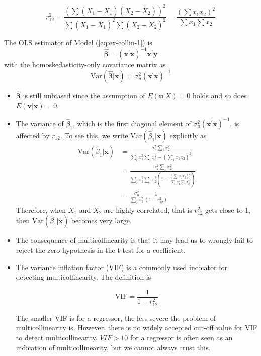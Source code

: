 \documentclass[a4paper,11pt]{article}
\newcommand{\var}{\mathrm{Var}}
\begin{document}
\begin{equation}
r^2_{12} = \frac{\left(\sum (X_1 - \bar{X}_1)(X_2 - \bar{X}_2)\right)^2}{\sum (X_1 - \bar{X}_1)^2 \sum (X_2 - \bar{X}_2)^2}
= \frac{\left( \sum x_1 x_2\right)^2}{\sum x_1 \sum x_2}
\end{equation}

The OLS estimator of Model (\ref{eq:ex-collin-1}) is
\begin{equation}
\label{eq:bhat-ex-collin}
\hat{\boldsymbol{\beta}} = \left(\mathbf{x}^{\prime} \mathbf{x}\right)^{-1} \mathbf{x}^{\prime} \mathbf{y}
\end{equation}
with the homoskedasticity-only covariance matrix as
\begin{equation}
\label{eq:bhat-cov-ex-collin}
\var(\hat{\boldsymbol{\beta}} | \mathbf{x}) = \sigma^2_u \left(\mathbf{x}^{\prime} \mathbf{x}\right)^{-1}
\end{equation}

\begin{itemize}
\item \(\hat{\boldsymbol{\beta}}\) is still unbiased since the assumption of
\(E(\mathbf{u} | X) = 0\) holds and so does \(E(\mathbf{v} |
  \mathbf{x}) = 0\).

\item The variance of \(\hat{\beta}_1\), which is the first diagonal element
of \(\sigma^2_u \left(\mathbf{x}^{\prime} \mathbf{x}\right)^{-1}\), is
affected by \(r_{12}\). To see this, we write \(\var(\hat{\beta}_1 | \mathbf{x})\)
explicitly as
\begin{equation*}
\begin{split}
\var(\hat{\beta}_1 | \mathbf{x}) &=  \frac{\sigma^2_u \sum_i x_2^2}{\sum_i x_1^2 \sum_i x_2^2 - (\sum_i x_1 x_2)^2} \\
&= \frac{\sigma^2_u \sum_i x_2^2}{\displaystyle \sum_i x_1^2 \sum_i x_2^2 \left(1 - \frac{(\sum_i x_1 x_2)^2}{\sum_i x_1^2 \sum_i x_2^2}\right)} \\
&= \frac{\sigma^2_u}{\sum_i x_1^2} \frac{1}{(1 - r^2_{12})}
\end{split}
\end{equation*}
Therefore, when \(X_1\) and \(X_2\) are highly correlated, that is
\(r^2_{12}\) gets close to 1, then \(\var(\hat{\beta}_1 | \mathbf{x})\)
becomes very large.

\item The consequence of multicollinearity is that it may lead us to
wrongly fail to reject the zero hypothesis in the t-test for a
coefficient.

\item The variance inflation factor (VIF) is a commonly used indicator for
detecting multicollinearity. The definition is

\begin{equation*}
\mathrm{VIF} = \frac{1}{1 - r^2_{12}}
\end{equation*}

The smaller VIF is for a regressor, the less severe the problem of
multicollinearity is. However, there is no widely accepted cut-off
value for VIF to detect multicollinearity. \(VIF > 10\) for a
regressor is often seen as an indication of multicollinearity, but
we cannot always trust this.
\end{itemize}
\end{document}
